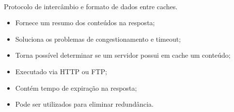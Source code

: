 \paragraph{} Protocolo de interc\^ambio e formato de dados entre caches.
\begin{itemize}
\item Fornece um resumo dos conte\'udos na resposta;
\item Soluciona os problemas de congestionamento e timeout;
\item Torna poss\'ivel determinar se um servidor possui em cache um conte\'udo;
\item Executado via HTTP ou FTP;
\item Cont\'em tempo de expira\c{c}\~ao na resposta;
\item Pode ser utilizados para eliminar redund\^ancia.
\end{itemize}
